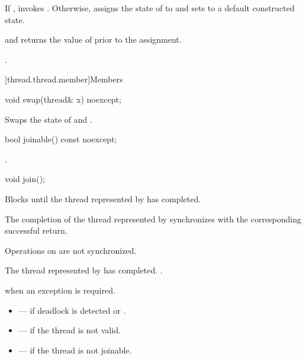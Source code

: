 \begin{itemdescr}
\pnum
\effects
If , invokes .
Otherwise, assigns the
state of  to  and sets  to a default constructed state.

\pnum
\ensures
{} and  returns the value of
 prior to the assignment.

\pnum
\returns
{}.
\end{itemdescr}

[thread.thread.member]{Members}

%
\begin{itemdecl}
void swap(thread& x) noexcept;
\end{itemdecl}

\begin{itemdescr}
\pnum
\effects
Swaps the state of  and .
\end{itemdescr}

%
\begin{itemdecl}
bool joinable() const noexcept;
\end{itemdecl}

\begin{itemdescr}
\pnum
\returns
{}.
\end{itemdescr}

%
\begin{itemdecl}
void join();
\end{itemdecl}

\begin{itemdescr}
\pnum
{}%
\effects
Blocks until the thread represented by  has completed.

\pnum
\sync
The completion of the thread represented by  synchronizes with
the corresponding successful
 return.
\begin{note}
Operations on
 are not synchronized.
\end{note}

\pnum
\ensures
The thread represented by  has completed. .

\pnum
\throws
{} when
an exception is required.

\pnum
\errors
\begin{itemize}
\item {} --- if deadlock is detected or
.

\item {} --- if the thread is not valid.

\item {} --- if the thread is not joinable.
\end{itemize}
\end{itemdescr}

